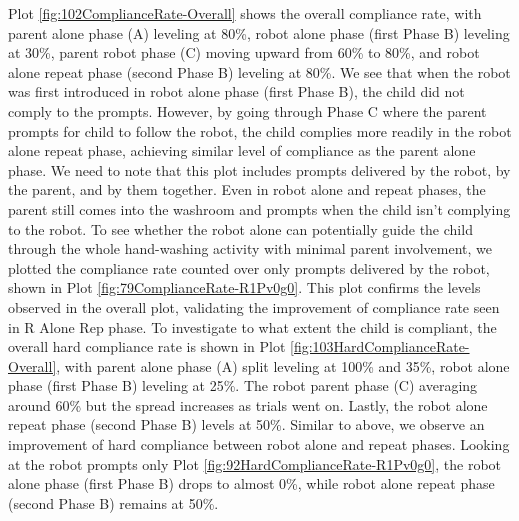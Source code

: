 Plot \ref{fig:102ComplianceRate-Overall} shows the overall compliance rate, with parent alone phase (A) leveling at 80\%, robot alone phase (first Phase B) leveling at 30\%, parent robot phase (C) moving upward from 60\% to 80\%, and robot alone repeat phase (second Phase B) leveling at 80\%.  We see that when the robot was first introduced in robot alone phase (first Phase B), the child did not comply to the prompts.  However, by going through Phase C where the parent prompts for child to follow the robot, the child complies more readily in the robot alone repeat phase, achieving similar level of compliance as the parent alone phase.  We need to note that this plot includes prompts delivered by the robot, by the parent, and by them together.  Even in robot alone and repeat phases, the parent still comes into the washroom and prompts when the child isn't complying to the robot.  To see whether the robot alone can potentially guide the child through the whole hand-washing activity with minimal parent involvement, we plotted the compliance rate counted over only prompts delivered by the robot, shown in Plot \ref{fig:79ComplianceRate-R1Pv0g0}.  This plot confirms the levels observed in the overall plot, validating the improvement of compliance rate seen in R Alone Rep phase.  To investigate to what extent the child is compliant, the overall hard compliance rate is shown in Plot \ref{fig:103HardComplianceRate-Overall}, with parent alone phase (A) split leveling at 100\% and 35\%, robot alone phase (first Phase B) leveling at 25\%.  The robot parent phase (C) averaging around 60\% but the spread increases as trials went on.  Lastly, the robot alone repeat phase (second Phase B) levels at 50\%.  Similar to above, we observe an improvement of hard compliance between robot alone and repeat phases.  Looking at the robot prompts only Plot \ref{fig:92HardComplianceRate-R1Pv0g0}, the robot alone phase (first Phase B) drops to almost 0\%, while robot alone repeat phase (second Phase B) remains at 50\%.
